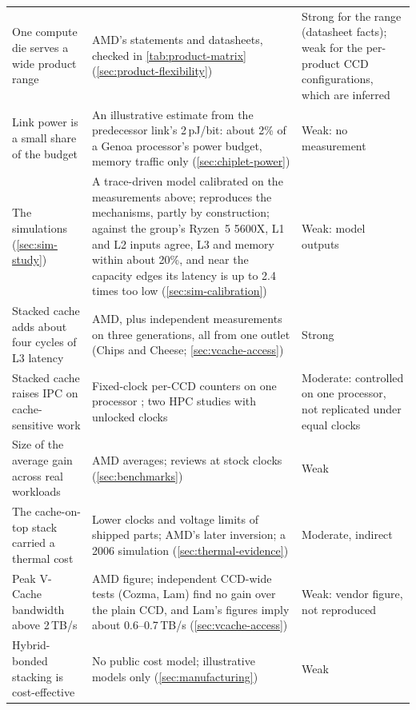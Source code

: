 \begin{table}[htbp]
\begin{tabularx}{\textwidth}{@{}>{\raggedright\arraybackslash}p{3.3cm}>{\raggedright\arraybackslash}X>{\raggedright\arraybackslash}p{3.6cm}@{}}
    One compute die serves a wide product range & AMD's statements and datasheets, checked in \cref{tab:product-matrix} (\cref{sec:product-flexibility}) & Strong for the range (datasheet facts); weak for the per-product CCD configurations, which are inferred \\
    Link power is a small share of the budget & An illustrative estimate from the predecessor link's 2\,pJ/bit: about 2\% of a Genoa processor's power budget, memory traffic only (\cref{sec:chiplet-power}) & Weak: no measurement \\
    The simulations (\cref{sec:sim-study}) & A trace-driven model calibrated on the measurements above; reproduces the mechanisms, partly by construction; against the group's Ryzen~5 5600X, L1 and L2 inputs agree, L3 and memory within about 20\%, and near the capacity edges its latency is up to 2.4 times too low (\cref{sec:sim-calibration}) & Weak: model outputs \\
    Stacked cache adds about four cycles of L3 latency & AMD, plus independent measurements on three generations, all from one outlet (Chips and Cheese; \cref{sec:vcache-access}) & Strong \\
    Stacked cache raises IPC on cache-sensitive work & Fixed-clock per-CCD counters on one processor \cite{lamAMDs7950X3DZen2023}; two HPC studies with unlocked clocks \cite{domkeLocusPerformanceQuantifying2023,lawendaEvaluatingImpactL32025} & Moderate: controlled on one processor, not replicated under equal clocks \\
    Size of the average gain across real workloads & AMD averages; reviews at stock clocks (\cref{sec:benchmarks}) & Weak \\
    The cache-on-top stack carried a thermal cost & Lower clocks and voltage limits of shipped parts; AMD's later inversion; a 2006 simulation (\cref{sec:thermal-evidence}) & Moderate, indirect \\
    Peak V-Cache bandwidth above 2\,TB/s & AMD figure; independent CCD-wide tests (Cozma, Lam) find no gain over the plain CCD, and Lam's figures imply about 0.6--0.7\,TB/s (\cref{sec:vcache-access}) & Weak: vendor figure, not reproduced \\
    Hybrid-bonded stacking is cost-effective & No public cost model; illustrative models only (\cref{sec:manufacturing}) & Weak \\
    \bottomrule
  \end{tabularx}
\end{table}


